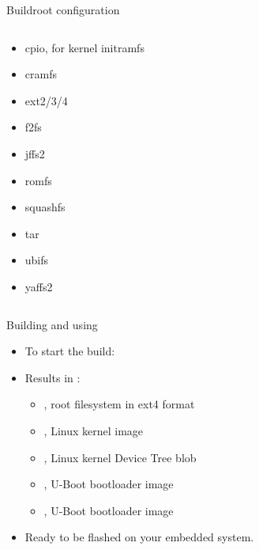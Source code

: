 \documentclass[aspectratio=169,obeyspaces,spaces,hyphens,dvipsnames]{beamer}
\begin{document}
\begin{frame}{Buildroot configuration}
\begin{columns}
{\begin{itemize}
\begin{itemize}
          \item cpio, for kernel initramfs
          \item cramfs
          \item ext2/3/4
          \item f2fs
          \item jffs2
          \item romfs
          \item squashfs
          \item tar
          \item ubifs
          \item yaffs2
        \end{itemize}
      \end{itemize}
    }
  \end{columns}
\end{frame}

\begin{frame}{Building and using}
  \begin{itemize}
  \item To start the build: 
  \item Results in :
    \begin{itemize}
    \item {}, root filesystem in ext4 format
    \item {}, Linux kernel image
    \item {}, Linux kernel Device Tree
      blob
    \item {}, U-Boot bootloader image
    \item {}, U-Boot bootloader image
    \end{itemize}
  \item Ready to be flashed on your embedded system.
  \end{itemize}
\end{frame}
\end{document}
